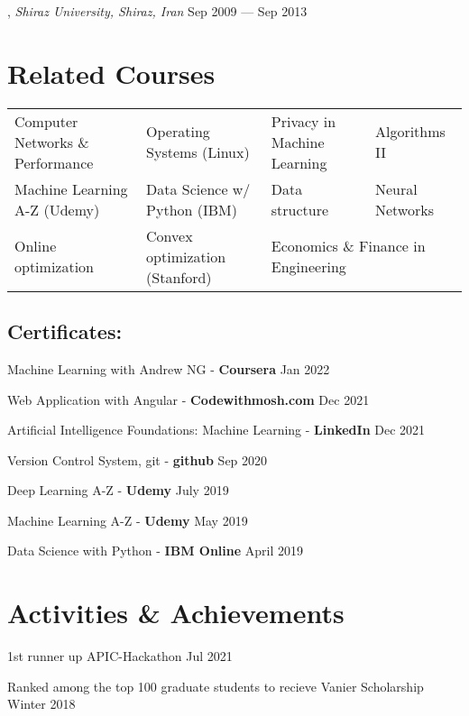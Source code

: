 \documentclass[letter,11pt]{article}
\begin{document}
, \textit{Shiraz University, Shiraz, Iran} \hfill	Sep 2009 --- Sep 2013






\section{Related Courses}
\begin{tabular}{p{5.9cm}p{5.3cm}p{5cm}p{5cm}}
	Computer Networks \& Performance & Operating Systems (Linux) & Privacy in Machine Learning & Algorithms II\\
	Machine Learning A-Z (Udemy) & Data Science w/ Python (IBM) & Data structure & Neural Networks \\
	Online optimization & Convex optimization (Stanford) & \multicolumn{2}{l}{Economics \& Finance in Engineering}\\
\end{tabular}
\subsection{Certificates:}
\begin{zitemize}
	\item Machine Learning with Andrew NG - \textbf{Coursera} \hfill Jan 2022
	\item Web Application with Angular - \textbf{Codewithmosh.com} \hfill Dec 2021
	\item Artificial Intelligence Foundations: Machine Learning - \textbf{LinkedIn} \hfill Dec 2021
	\item Version Control System, git - \textbf{github} \hfill Sep 2020
	\item Deep Learning A-Z - \textbf{Udemy} \hfill July 2019
	\item Machine Learning A-Z - \textbf{Udemy} \hfill May 2019
	\item Data Science with Python - \textbf{IBM Online} \hfill April 2019
\end{zitemize}



\section{Activities \& Achievements}
 	1st runner up APIC-Hackathon	\hfill Jul 2021

Ranked among the top 100 graduate students to recieve Vanier Scholarship	\hfill Winter 2018
\end{document}
